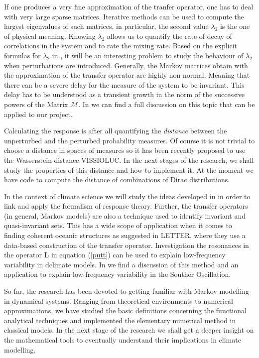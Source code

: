 If one produces a very fine approximation of the tranfer operator, one has to deal with very large sparse matrices. Iterative methods can be used to compute the largest eigenvalues of such matrices, in particular, the second value $\lambda_2$ is the one of physical meaning. Knowing $\lambda_2$ allows us to quantify the rate of decay of correlations in the system and to rate the mixing rate. Based on the explicit formulas for $\lambda_2$ in \cite{dobrushin}, it will be an interesting problem to study the behaviour of $\lambda_2$ when perturbations are introduced. Generally, the Markov matrices obtain with the approximation of the transfer operator are highly non-normal. Meaning that there can be a severe delay for the measure of the system to be invariant. This delay has to be understood as a transient growth in the norm of the successive powers of the Matrix $\mathcal{M}$. In \cite{trefethenps} we can find a full discussion on this topic that can be applied to our project.

Calculating the response is after all quantifying the \emph{distance} between the unperturbed and the perturbed probability measures. Of course it is not trivial to choose a distance in spaces of measures so it has been recently proposed to use the Wasserstein distance VISSIOLUC. In the next stages of the research, we shall study the properties of this distance and how to implement it. At the moment we have code to compute the distance of combinations of Dirac distributions.

In the context of climate science we will study the ideas developed in \cite{leith} in order to link and apply the formalism of response theory. Further, the transfer operators (in general, Markov models) are also a technique used to identify invariant and quasi-invariant sets. This has a wide scope of application when it comes to finding coherent oceanic structures as suggested in LETTER, where they use a data-based construction of the transfer operator. Investigation the resonances in the operator $\mathbf{L}$ in equation (\ref{putt}) can be used to explain low-frequency variability in dclimate models. In \cite{chekroun} we find a discussion of this method and an application to explain low-frequency variability in the Souther Oscillation.

So far, the research has been devoted to getting familiar with Markov modelling in dynamical systems. Ranging from theoretical environments to numerical approximations, we have studied the basic definitions concerning the functional analytical techniques and implemented the elementary numerical method in classical models. In the next stage of the research we shall get a deeper insight on the mathematical tools to eventually understand their implications in climate modelling.


